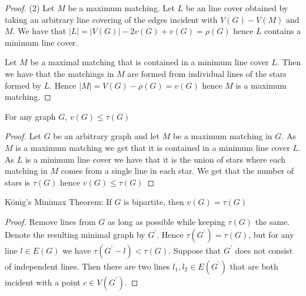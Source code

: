 \documentclass[12pt]{article}
\newenvironment{theorem}[2][Theorem]{\begin{trivlist}
\item[\hskip \labelsep {\bfseries #1}\hskip \labelsep {\bfseries #2.}]}{\end{trivlist}}
\newenvironment{exercise}[2][Exercise]{\begin{trivlist}
\item[\hskip \labelsep {\bfseries #1}\hskip \labelsep {\bfseries #2.}]}{\end{trivlist}}
\begin{document}
\begin{proof}{(2)}
    Let $M$ be a maximum matching. Let $L$ be an line cover obtained by taking an arbitrary line covering of the edges incident with $V(G)-V(M)$ and $M$. We have that $|L|=|V(G)|-2v(G)+v(G)=\rho(G)$ hence $L$ contains a minimum line cover.

    Let $M$ be a maximal matching that is contained in a minimum line cover $L$.
    Then we have that the matchings in $M$ are formed from individual lines of the stars formed by $L$. Hence $|M|=V(G)-\rho(G)=v(G)$ hence $M$ is a maximum matching.
\end{proof}


\begin{exercise}
    {1.0.4}
    For any graph $G$, $v(G)\leq \tau(G)$
\end{exercise}

\begin{proof}

    Let $G$ be an arbitrary graph and let $M$ be a maximum matching in $G$. As $M$ is a maximum matching we get that it is contained in a minimum line cover $L$. As $L$ is a minimum line cover we have that it is the union of stars where each matching in $M$ comes from a single line in each star. We get that the number of stars is $\tau(G)$ hence $v(G)\leq \tau(G)$
\end{proof}
\begin{theorem}
    {1.1.1}
    König's Minimax Theorem:
    If $G$ is bipartite, then $v(G)=\tau(G)$
\end{theorem}

\begin{proof}
    Remove lines from $G$ as long as possible while keeping $\tau(G)$ the same. Denote the resulting minimal graph by $G^\prime$. Hence $\tau(G^\prime)=\tau(G)$, but for any line $l\in E(G)$ we have $\tau(G^\prime -l)<\tau(G)$. Suppose that $G^\prime$ does not consist of independent lines. Then there are two lines $l_1, l_2 \in E(G^\prime)$ that are both incident with a point $c \in V(G^\prime)$.
\end{proof}
\end{document}
